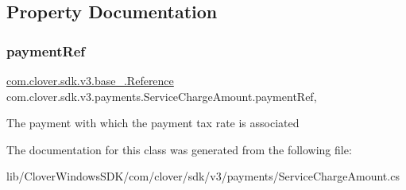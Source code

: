 \subsection{Property Documentation}
\mbox{\label{classcom_1_1clover_1_1sdk_1_1v3_1_1payments_1_1_service_charge_amount_a374695852cc1abe23dab037151f76b47}} 
\subsubsection{\texorpdfstring{payment\+Ref}{paymentRef}}
{\footnotesize\ttfamily \hyperlink{classcom_1_1clover_1_1sdk_1_1v3_1_1base___1_1_reference}{com.\+clover.\+sdk.\+v3.\+base\+\_\+.\+Reference} com.\+clover.\+sdk.\+v3.\+payments.\+Service\+Charge\+Amount.\+payment\+Ref\hspace{0.3cm}{\ttfamily [get]}, {\ttfamily [set]}}



The payment with which the payment tax rate is associated 



The documentation for this class was generated from the following file\+:\begin{DoxyCompactItemize}
\item 
lib/\+Clover\+Windows\+S\+D\+K/com/clover/sdk/v3/payments/Service\+Charge\+Amount.\+cs\end{DoxyCompactItemize}

